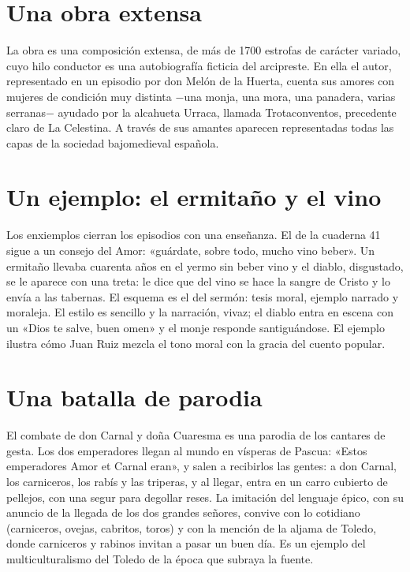 \documentclass{book}
\begin{document}

\section{Una obra extensa}

La obra es una composición extensa, de más de 1700 estrofas de carácter variado, cuyo hilo conductor es una autobiografía ficticia del arcipreste. En ella el autor, representado en un episodio por don Melón de la Huerta, cuenta sus amores con mujeres de condición muy distinta \(-\)una monja, una mora, una panadera, varias serranas\(-\) ayudado por la alcahueta Urraca, llamada Trotaconventos, precedente claro de La Celestina. A través de sus amantes aparecen representadas todas las capas de la sociedad bajomedieval española.


\section{Un ejemplo: el ermitaño y el vino}

Los enxiemplos cierran los episodios con una enseñanza. El de la cuaderna 41 sigue a un consejo del Amor: «guárdate, sobre todo, mucho vino beber». Un ermitaño llevaba cuarenta años en el yermo sin beber vino y el diablo, disgustado, se le aparece con una treta: le dice que del vino se hace la sangre de Cristo y lo envía a las tabernas. El esquema es el del sermón: tesis moral, ejemplo narrado y moraleja. El estilo es sencillo y la narración, vivaz; el diablo entra en escena con un «Dios te salve, buen omen» y el monje responde santiguándose. El ejemplo ilustra cómo Juan Ruiz mezcla el tono moral con la gracia del cuento popular.


\section{Una batalla de parodia}

El combate de don Carnal y doña Cuaresma es una parodia de los cantares de gesta. Los dos emperadores llegan al mundo en vísperas de Pascua: «Estos emperadores Amor et Carnal eran», y salen a recibirlos las gentes: a don Carnal, los carniceros, los rabís y las triperas, y al llegar, entra en un carro cubierto de pellejos, con una segur para degollar reses. La imitación del lenguaje épico, con su anuncio de la llegada de los dos grandes señores, convive con lo cotidiano (carniceros, ovejas, cabritos, toros) y con la mención de la aljama de Toledo, donde carniceros y rabinos invitan a pasar un buen día. Es un ejemplo del multiculturalismo del Toledo de la época que subraya la fuente.
\end{document}
